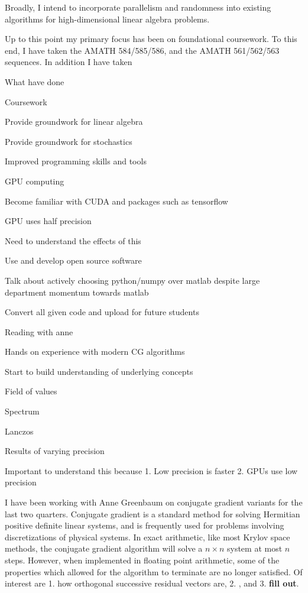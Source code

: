 \documentclass[12pt]{article}
\begin{document}
\maketitle
\vspace{2em}

Broadly, I intend to incorporate parallelism and randomness into existing algorithms for high-dimensional linear algebra problems. 


Up to this point my primary focus has been on foundational coursework. To this end, I have taken the AMATH 584/585/586, and the AMATH 561/562/563 sequences. In addition I have taken 


What have done

Coursework

Provide groundwork for linear algebra

Provide groundwork for stochastics

Improved programming skills and tools

GPU computing

Become familiar with CUDA and packages such as tensorflow

GPU uses half precision

Need to understand the effects of this

Use and develop open source software

Talk about actively choosing python/numpy over matlab despite large department momentum towards matlab

Convert all given code and upload for future students


Reading with anne

Hands on experience with modern CG algorithms

Start to build understanding of underlying concepts

Field of values

Spectrum

Lanczos

Results of varying precision

Important to understand this because 1. Low precision is faster 2. GPUs use low precision 


I have been working with Anne Greenbaum on conjugate gradient variants for the last two quarters. Conjugate gradient is a standard method for solving Hermitian positive definite linear systems, and is frequently used for problems involving discretizations of physical systems. In exact arithmetic, like most Krylov space methods, the conjugate gradient algorithm will solve a \( n\times n \) system at most \( n \) steps. However, when implemented in floating point arithmetic, some of the properties which allowed for the algorithm to terminate are no longer satisfied. Of interest are 1. how orthogonal successive residual vectors are, 2. , and 3. \textbf{fill out}.
\end{document}

